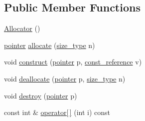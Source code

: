 \subsection*{Public Member Functions}
\begin{DoxyCompactItemize}
\item 
\hyperlink{classAllocator_a4e2bf5fbf94e2206bb72b71ad4b7ffb3}{Allocator} ()
\item 
\hyperlink{classAllocator_a7df4693123ad6d168217e3853cd15495}{pointer} \hyperlink{classAllocator_a8a19b7b675f5434c28c68fb15de86f36}{allocate} (\hyperlink{classAllocator_aec4c70d3e80d2b7d11bbb8bd8a62f016}{size\-\_\-type} n)
\item 
void \hyperlink{classAllocator_a6e6a26ece248be1eb76ed691c085cd65}{construct} (\hyperlink{classAllocator_a7df4693123ad6d168217e3853cd15495}{pointer} p, \hyperlink{classAllocator_aff863afcf191fb225997ae2d51314bf5}{const\-\_\-reference} v)
\item 
void \hyperlink{classAllocator_a731b4679156aeb43318224fc8e41e4ce}{deallocate} (\hyperlink{classAllocator_a7df4693123ad6d168217e3853cd15495}{pointer} p, \hyperlink{classAllocator_aec4c70d3e80d2b7d11bbb8bd8a62f016}{size\-\_\-type} n)
\item 
void \hyperlink{classAllocator_af156a6a50a8c62c70e40cf342a3b64cb}{destroy} (\hyperlink{classAllocator_a7df4693123ad6d168217e3853cd15495}{pointer} p)
\item 
const int \& \hyperlink{classAllocator_a107cf1e09d9119f2819c0b5f6cdbe20b}{operator\mbox{[}$\,$\mbox{]}} (int i) const 
\end{DoxyCompactItemize}
